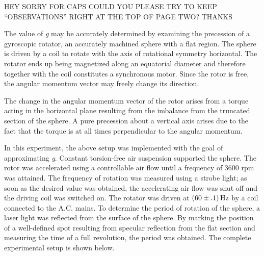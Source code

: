 
\physics

\begin{paperabs}

	HEY SORRY FOR CAPS COULD YOU PLEASE TRY TO KEEP ``OBSERVATIONS'' RIGHT AT THE TOP OF PAGE TWO? THANKS
	
\end{paperabs}

\begin{paper}
	
	
	The value of \textit{g} may be accurately determined by examining the precession of a gyroscopic rotator, an accurately machined sphere with a flat region. The sphere is driven by a coil to rotate with the axis of rotational symmetry horizontal. The rotator ends up being magnetized along an equatorial diameter and therefore together with the coil constitutes a synchronous motor. Since the rotor is free, the angular momentum vector may freely change its direction. 
	
	The change in the angular momentum vector of the rotor arises from a torque acting in the horizontal plane resulting from the imbalance from the truncated section of the sphere. A pure precession about a vertical axis arises due to the fact that the torque is at all times perpendicular to the angular momentum. 
	
	In this experiment, the above setup was implemented with the goal of approximating \textit{g}. Constant torsion-free air suspension supported the sphere. The rotor was accelerated using a controllable air flow until a frequency of \( 3600 \) rpm was attained. The frequency of rotation was measured using a strobe light; as soon as the desired value was obtained, the accelerating air flow was shut off and the driving coil was switched on. The rotator was driven at \( \left(60 \pm .1\right) \si{\hertz} \) by a coil connected to the A.C. mains. To determine the period of rotation of the sphere, a laser light was reflected from the surface of the sphere. By marking the position of a well-defined spot resulting from specular reflection from the flat section and measuring the time of a full revolution, the period was obtained. The complete experimental setup is shown below.
	
	

\end{paper}
